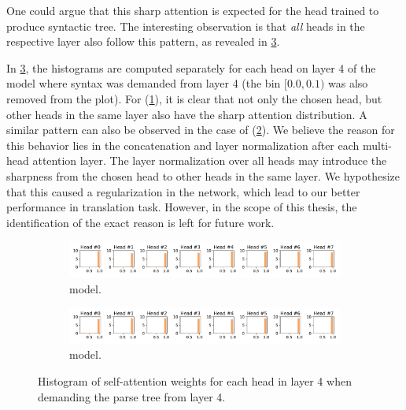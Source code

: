One could argue that this sharp attention is expected for the head trained to produce syntactic tree.
The interesting observation is that \emph{all} heads in the respective layer also follow this pattern, as revealed in \cref{fig:att_dist_4}.

In \cref{fig:att_dist_4}, the histograms are computed separately for each head on layer 4 of the model where syntax was demanded from layer 4 (the bin $[0.0,0.1)$ was also removed from the plot).
For \DepParse (\cref{fig:att_dist_4_dep}), it is clear that not only the chosen head, but other heads in the same layer also have the sharp attention distribution.
A similar pattern can also be observed in the case of \DiagonalParse (\cref{fig:att_dist_4_mono}).
We believe the reason for this behavior lies in the concatenation and layer normalization after each multi-head attention layer.
The layer normalization over all heads may introduce the sharpness from the chosen head to other heads in the same layer.
We hypothesize that this caused a regularization in the network, which lead to our better performance in translation task.
However, in the scope of this thesis, the identification of the exact reason is left for future work.

\begin{figure}[t]
    \centering
    \begin{subfigure}[b]{\textwidth}
	    \includegraphics[width=\textwidth]{img/att_dist_4.pdf}
        \caption{\DepParse model.}
        \label{fig:att_dist_4_dep}
    \end{subfigure}
    \par\medskip
    \begin{subfigure}[b]{\textwidth}
	    \includegraphics[width=\textwidth]{img/mono_att_dist_4.pdf}
        \caption{\DiagonalParse model.}
        \label{fig:att_dist_4_mono}
    \end{subfigure}
    \caption{Histogram of self-attention weights for each head in layer 4 when demanding the parse tree from layer 4.}
    \label{fig:att_dist_4}
\end{figure}

